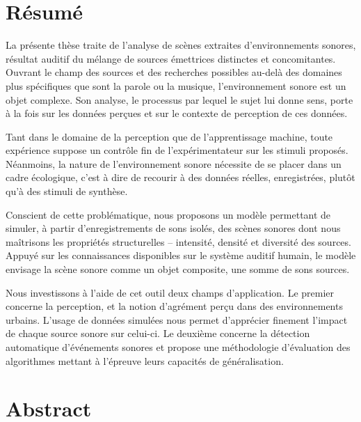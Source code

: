 \begingroup
\let\clearpage\relax
\let\cleardoublepage\relax
\let\cleardoublepage\relax

\chapter*{Résumé}

La présente thèse traite de l'analyse de scènes extraites d'environnements sonores, résultat auditif du mélange de sources émettrices distinctes et concomitantes. Ouvrant le champ des sources et des recherches possibles au-delà des domaines plus spécifiques que sont la parole ou la musique, l'environnement sonore est un objet complexe. Son analyse, le processus par lequel le sujet lui donne sens, porte à la fois sur les données perçues et sur le contexte de perception de ces données.

Tant dans le domaine de la perception que de l'apprentissage machine, toute expérience suppose un contrôle fin de l'expérimentateur sur les stimuli proposés. Néanmoins, la nature de l'environnement sonore nécessite de se placer dans un cadre écologique, c'est à dire de recourir à des données réelles, enregistrées, plutôt qu'à des stimuli de synthèse.

Conscient de cette problématique, nous proposons un modèle permettant de simuler, à partir d'enregistrements de sons isolés, des scènes sonores dont nous maîtrisons les propriétés structurelles -- intensité, densité et diversité des sources. Appuyé sur les connaissances disponibles sur le système auditif humain, le modèle envisage la scène sonore comme un objet composite, une somme de sons sources.

Nous investissons à l'aide de cet outil deux champs d'application. Le premier concerne la perception, et la notion d'agrément perçu dans des environnements urbains. L'usage de données simulées nous permet d'apprécier finement l'impact de chaque source sonore sur celui-ci. Le deuxième concerne la détection automatique d'événements sonores et propose une méthodologie d'évaluation des algorithmes mettant à l'épreuve leurs capacités de généralisation.

\newpage

\chapter*{Abstract}

